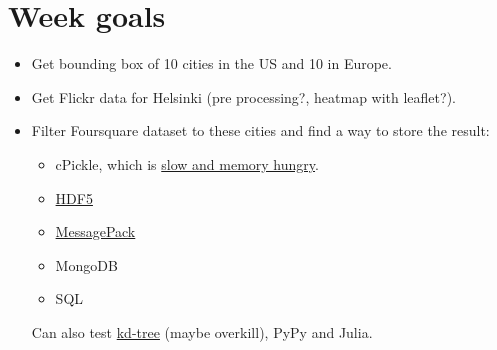 \section*{Week goals}
\begin{itemize}
	\item Get bounding box of 10 cities in the US and 10 in Europe.
	\item Get Flickr data for Helsinki (pre processing?, heatmap with
		leaflet?).
	\item Filter Foursquare dataset to these cities and find a way to store
		the result:
		\begin{itemize}
			\item cPickle, which is
				\href{http://www.shocksolution.com/2010/01/storing-large-numpy-arrays-on-disk-python-pickle-vs-hdf5adsf/}{slow
				and memory hungry}.
			\item \href{https://github.com/telegraphic/hickle}{HDF5}
			\item \href{https://github.com/msgpack/msgpack-python}{MessagePack}
			\item MongoDB
			\item SQL
		\end{itemize}
		Can also test
		\href{http://docs.scipy.org/doc/scipy/reference/generated/scipy.spatial.KDTree.html}{kd-tree}
		(maybe overkill), PyPy and Julia.
\end{itemize}

